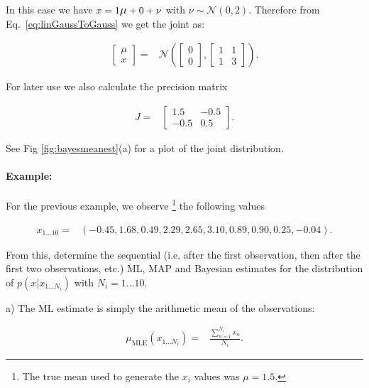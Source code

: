 In this case we have $x=1\mbox{\large$\mu$}+0+\nu$ with $\nu\sim\mathcal{N}(0,2)$.
Therefore from Eq.~\ref{eq:linGaussToGauss} we get the joint as:

\begin{align*}
\left[\begin{array}{c}
\mu\\
x
\end{array}\right]= & \mathcal{N}\left(\left[\begin{array}{c}
0\\
0
\end{array}\right],\left[\begin{array}{cc}
1 & 1\\
1 & 3
\end{array}\right]\right).
\end{align*}


For later use we also calculate the precision matrix

\begin{align*}
J= & \left[\begin{array}{cc}
1.5 & -0.5\\
-0.5 & 0.5
\end{array}\right].
\end{align*}


See Fig \ref{fig:bayesmeanest}(a) for a plot of the joint distribution.


\paragraph{Example:}

For the previous example, we observe%
\footnote{The true mean used to generate the $x_{i}$ values was $\mu=1.5$.%
} the following values

\begin{align*}
x_{1\ldots10}= & (-0.45,1.68,0.49,2.29,2.65,3.10,0.89,0.90,0.25,-0.04).
\end{align*}


From this, determine the sequential (i.e. after the first observation,
then after the first two observations, etc.) ML, MAP and Bayesian
estimates for the distribution of $p(x|x_{1\ldots N_{i}})$ with
$N_{i}=1\ldots10$.

a) The ML estimate is simply the arithmetic mean of the observations:

\begin{align*}
\mu_{\mbox{MLE}}(x_{1\ldots N_{i}})= & \frac{\sum_{n=1}^{N_{i}}x_{n}}{N_{i}}.
\end{align*}


